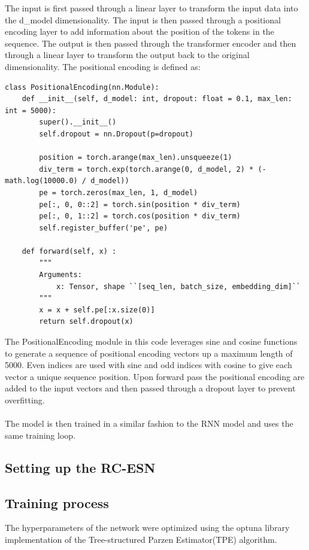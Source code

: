 \documentclass[11pt]{article}
\begin{document}
The input is first passed through a linear layer to transform the input data into the d\_model dimensionality. The input is then passed through a positional encoding layer to add information about the position of the tokens in the sequence. The output is then passed through the transformer encoder and then through a linear layer to transform the output back to the original dimensionality. The positional encoding is defined as:

\begin{lstlisting}
class PositionalEncoding(nn.Module):
    def __init__(self, d_model: int, dropout: float = 0.1, max_len: int = 5000):
        super().__init__()
        self.dropout = nn.Dropout(p=dropout)

        position = torch.arange(max_len).unsqueeze(1)
        div_term = torch.exp(torch.arange(0, d_model, 2) * (-math.log(10000.0) / d_model))
        pe = torch.zeros(max_len, 1, d_model)
        pe[:, 0, 0::2] = torch.sin(position * div_term)
        pe[:, 0, 1::2] = torch.cos(position * div_term)
        self.register_buffer('pe', pe)

    def forward(self, x) :
        """
        Arguments:
            x: Tensor, shape ``[seq_len, batch_size, embedding_dim]``
        """
        x = x + self.pe[:x.size(0)]
        return self.dropout(x)
\end{lstlisting}

The PositionalEncoding module in this code leverages sine and cosine functions to generate a sequence of positional encoding vectors up a maximum length of 5000. Even indices are used with sine and odd indices with cosine to give each vector a unique sequence position. Upon forward pass the positional encoding are added to the input vectors and then passed through a dropout layer to prevent overfitting.  \\ \\ The model is then trained in a similar fashion to the RNN model and uses the same training loop.

\subsection{Setting up the RC-ESN}

\subsection{Training process}
The hyperparameters of the network were optimized using the optuna library implementation of the Tree-structured Parzen Estimator(TPE) algorithm. 
\end{document}
